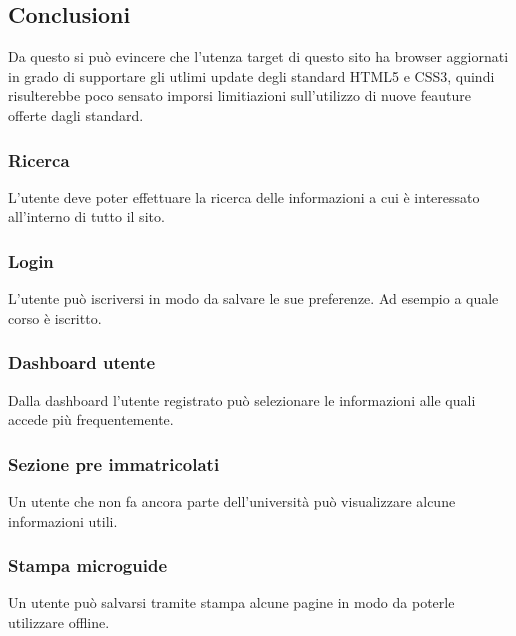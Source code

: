 
\subsection{Conclusioni}

Da questo si può evincere che l'utenza target di questo sito ha browser aggiornati in grado di supportare gli utlimi update degli standard HTML5 e CSS3, quindi risulterebbe poco sensato imporsi limitiazioni sull'utilizzo di nuove feauture offerte dagli standard.

\subsubsection{Ricerca}
L'utente deve poter effettuare la ricerca delle informazioni a cui è interessato all'interno di tutto il sito.
\subsubsection{Login}
L'utente può iscriversi in modo da salvare le sue preferenze. Ad esempio a quale corso è iscritto.
\subsubsection{Dashboard utente}
Dalla dashboard l'utente registrato può selezionare le informazioni alle quali accede più frequentemente.
\subsubsection{Sezione pre immatricolati}
Un utente che non fa ancora parte dell'università può visualizzare alcune informazioni utili.
\subsubsection{Stampa microguide}
Un utente può salvarsi tramite stampa alcune pagine in modo da poterle utilizzare offline. 